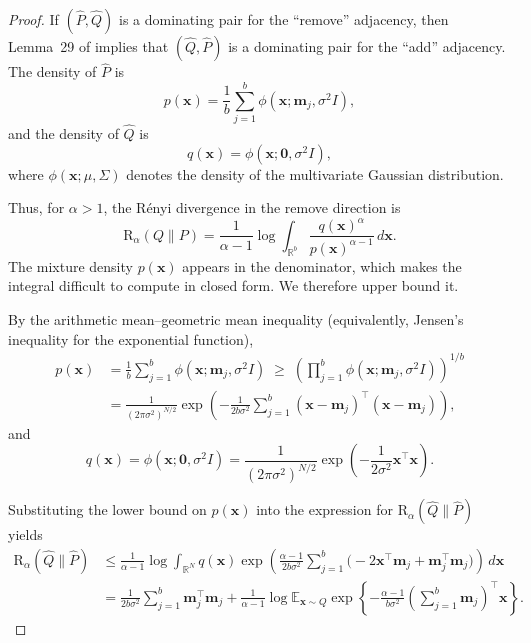 \documentclass{article}
\theoremstyle{plain}
\theoremstyle{definition}
\theoremstyle{remark}
\begin{document}
\RemoveRenyiBound*
\begin{proof}
If $(\hat{P},\hat{Q})$ is a dominating pair for the ``remove'' adjacency, then Lemma~29 of \citet{zhu2022optimal} implies that $(\hat{Q},\hat{P})$ is a dominating pair for the ``add'' adjacency.
The density of $\hat{P}$ is
\[
p(\mathbf{x}) = \frac{1}{b}\sum_{j=1}^{b} \phi(\mathbf{x}; \mathbf{m}_j, \sigma^2 I),
\]
and the density of $\hat{Q}$ is
\[
q(\mathbf{x}) = \phi(\mathbf{x}; \mathbf{0}, \sigma^2 I),
\]
where $\phi(\mathbf{x}; \mu, \Sigma)$ denotes the density of the multivariate Gaussian distribution.

Thus, for $\alpha>1$, the Rényi divergence in the remove direction is
\begin{equation}
    \mathrm{R}_{\alpha}(Q\|P)
    =
    \frac{1}{\alpha - 1}\log \int_{\mathbb{R}^{b}} \frac{q(\mathbf{x})^{\alpha}}{p(\mathbf{x})^{\alpha - 1}}\,d\mathbf{x}.
\end{equation}
The mixture density $p(\mathbf{x})$ appears in the denominator, which makes the integral difficult to compute in closed form. We therefore upper bound it.

By the arithmetic mean--geometric mean inequality (equivalently, Jensen's inequality for the exponential function),
\begin{align}
    p(\mathbf{x})
    &=
    \frac{1}{b}\sum_{j=1}^{b} \phi(\mathbf{x}; \mathbf{m}_j, \sigma^2 I)
    \;\ge\;
    \left(\prod_{j=1}^{b}\phi(\mathbf{x}; \mathbf{m}_j, \sigma^2 I)\right)^{1/b}
    \\
    &=
    \frac{1}{(2\pi \sigma^2)^{N/2}}
    \exp\!\left(
    -\frac{1}{2b\sigma^2}\sum_{j = 1}^{b}(\mathbf{x}- \mathbf{m}_j)^\top(\mathbf{x}- \mathbf{m}_j)
    \right),
\end{align}
and
\begin{equation}
    q(\mathbf{x})
    =
    \phi(\mathbf{x}; \mathbf{0}, \sigma^2 I)
    =
    \frac{1}{(2\pi \sigma^2)^{N/2}}
    \exp\!\left(-\frac{1}{2\sigma^2} \mathbf{x}^\top\mathbf{x}\right).
\end{equation}

Substituting the lower bound on $p(\mathbf{x})$ into the expression for $\mathrm{R}_{\alpha}(\hat{Q}\|\hat{P})$ yields
\begin{align}
    \mathrm{R}_{\alpha}(\hat{Q}\|\hat{P})
    &\le
    \frac{1}{\alpha - 1}
    \log\int_{\mathbb{R}^N}
    q(\mathbf{x})
    \exp\!\left(
    \frac{\alpha - 1}{2b\sigma^2}
    \sum_{j = 1}^b \bigl(-2\mathbf{x}^\top \mathbf{m}_j + \mathbf{m}_j^\top \mathbf{m}_j\bigr)
    \right)\,d\mathbf{x}
    \\
    &=
    \frac{1}{2b\sigma^2}\sum_{j = 1}^{b} \mathbf{m}_j^\top \mathbf{m}_j
    +
    \frac{1}{\alpha - 1}
    \log
    \mathbb{E}_{\mathbf{x}\sim Q}
    \exp\!\left\{
    -\frac{\alpha - 1}{b\sigma^2}
    \left(\sum_{j = 1}^{b} \mathbf{m}_j \right)^\top \mathbf{x}
    \right\}.
\end{align}


\end{proof}
\end{document}

